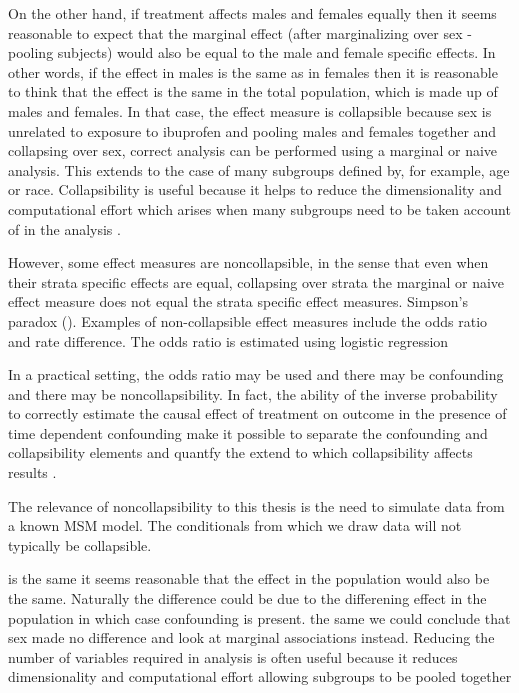 \documentclass[11pt]{article}
\begin{document}
On the other hand, if treatment affects males and females equally then
it seems reasonable to expect that the marginal effect (after
marginalizing over sex - pooling subjects) would also be equal to the
male and female specific effects. In other words, if the effect in males
is the same as in females then it is reasonable to think that the effect
is the same in the total population, which is made up of males and
females. In that case, the effect measure is collapsible because sex is
unrelated to exposure to ibuprofen and pooling males and females
together and collapsing over sex, correct analysis can be performed
using a marginal or naive analysis. This extends to the case of many
subgroups defined by, for example, age or race. Collapsibility is useful
because it helps to reduce the dimensionality and computational effort
which arises when many subgroups need to be taken account of in the
analysis \citet{Didelez2010}. \linebreak

However, some effect measures are noncollapsible, in the sense that even
when their strata specific effects are equal, collapsing over strata the
marginal or naive effect measure does not equal the strata specific
effect measures. Simpson's paradox (\citet{}). Examples of
non-collapsible effect measures include the odds ratio and rate
difference. The odds ratio is estimated using logistic regression

In a practical setting, the odds ratio may be used and there may be
confounding and there may be noncollapsibility. In fact, the ability of
the inverse probability to correctly estimate the causal effect of
treatment on outcome in the presence of time dependent confounding make
it possible to separate the confounding and collapsibility elements and
quantfy the extend to which collapsibility affects results
\citet{Pang2016}. \linebreak

The relevance of noncollapsibility to this thesis is the need to
simulate data from a known MSM model. The conditionals from which we
draw data will not typically be collapsible.

is the same it seems reasonable that the effect in the population would
also be the same. Naturally the difference could be due to the
differening effect in the population in which case confounding is
present. the same we could conclude that sex made no difference and look
at marginal associations instead. Reducing the number of variables
required in analysis is often useful because it reduces dimensionality
and computational effort allowing subgroups to be pooled together
\end{document}
